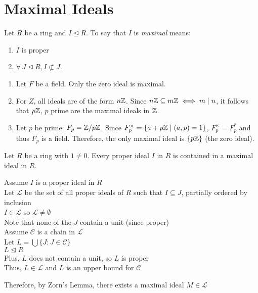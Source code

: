 \documentclass[letterpaper,12pt,fleqn]{article}
\newcommand{\ide}{\trianglelefteq}
\begin{document}
\section*{Maximal Ideals}

\begin{definition}
  Let $R$ be a ring and $I\ide R$. To say that $I$ is \emph{maximal} means:
  \begin{enumerate}
  \item $I$ is proper
  \item $\forall\,J\ide R,I\not\subset J$.
  \end{enumerate}
\end{definition}

\begin{example}
  \listbreak
  \begin{enumerate}
  \item Let $F$ be a field. Only the zero ideal is maximal.

  \item For $Z$, all ideals are of the form $n\mathbb{Z}$. Since
    $n\mathbb{Z}\subseteq m\mathbb{Z}\iff m\mid n$, it follows that $p\mathbb{Z}$, $p$ prime are the
    maximal ideals in $\mathbb{Z}$.

  \item Let $p$ be prime. $F_p=\mathbb{Z}/p\mathbb{Z}$. Since
    $F_p^{\times}=\{a+p\mathbb{Z}\mid(a,p)=1\}$, $F_p^{\times}=F_p^*$ and thus $F_p$ is
    a field. Therefore, the only maximal ideal is $\{p\mathbb{Z}\}$ (the zero ideal).
  \end{enumerate}
\end{example}

\begin{theorem}
  Let $R$ be a ring with $1\ne0$. Every proper ideal $I$ in $R$ is contained
  in a maximal ideal in $R$.
\end{theorem}

\begin{theproof}
  Assume $I$ is a proper ideal in $R$ \\
  Let $\mathcal{L}$ be the set of all proper ideals of $R$ such that
  $I\subseteq J$, partially ordered by inclusion \\
  $I\in\mathcal{L}$ so $\mathcal{L}\ne\emptyset$ \\
  Note that none of the $J$ contain a unit (since proper) \\
  Assume $\mathcal{C}$ is a chain in $\mathcal{L}$ \\
  Let $L=\bigcup\{J:J\in\mathcal{C}\}$ \\
  $L\ide R$ \\
  Plus, $L$ does not contain a unit, so $L$ is proper \\
  Thus, $L\in\mathcal{L}$ and $L$ is an upper bound for $\mathcal{C}$

  Therefore, by Zorn's Lemma, there exists a maximal ideal $M\in\mathcal{L}$
\end{theproof}
\end{document}
